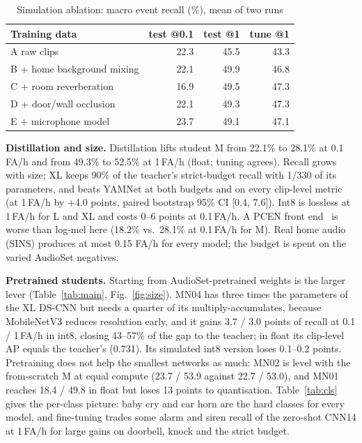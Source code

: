 \documentclass[conference]{IEEEtran}
\begin{document}
\begin{table}[t]\centering\caption{Simulation ablation: macro event recall (\%), mean of two runs}\label{tab:sim}
\begin{tabular}{lrrr}\toprule
Training data & test @0.1 & test @1 & tune @1 \\ \midrule
A raw clips & 22.3 & 45.5 & 43.3 \\
B + home background mixing & 22.1 & 49.9 & 46.8 \\
C + room reverberation & 16.9 & 49.5 & 47.3 \\
D + door/wall occlusion & 22.1 & 49.3 & 47.3 \\
E + microphone model & 23.7 & 49.1 & 47.1 \\ \bottomrule
\end{tabular}\end{table}

\textbf{Distillation and size.} Distillation lifts student M from 22.1\% to 28.1\% at 0.1\,FA/h
and from 49.3\% to 52.5\% at 1\,FA/h (float; tuning agrees). Recall grows with size; XL keeps 90\% of the teacher's strict-budget recall with 1/330 of its
parameters, and beats YAMNet at both budgets and on every clip-level metric (at 1\,FA/h by
+4.0 points, paired bootstrap 95\% CI [0.4, 7.6]). Int8 is lossless at
1\,FA/h for L and XL and costs 0--6 points at 0.1\,FA/h. A PCEN front end~\cite{pcen} is worse
than log-mel here (18.2\% vs.\ 28.1\% at 0.1\,FA/h for M). Real home audio (SINS) produces at
most 0.15 FA/h for every model; the budget is spent on the varied AudioSet negatives.

\textbf{Pretrained students.} Starting from AudioSet-pretrained weights is the larger lever
(Table~\ref{tab:main}, Fig.~\ref{fig:size}). MN04 has three times the parameters of the XL
DS-CNN but needs a quarter of its multiply-accumulates, because MobileNetV3 reduces resolution
early, and it gains 3.7 / 3.0 points of recall at 0.1 / 1\,FA/h in int8, closing 43--57\% of the
gap to the teacher; in float its clip-level AP equals the teacher's (0.731). Its simulated int8
version loses 0.1--0.2 points. Pretraining does not help the smallest networks as much: MN02 is
level with the from-scratch M at equal compute (23.7 / 53.9 against 22.7 / 53.0), and MN01
reaches 18.4 / 49.8 in float but loses 13 points to quantisation. Table~\ref{tab:cls} gives the
per-class picture: baby cry and car horn are the hard classes for every model, and fine-tuning
trades some alarm and siren recall of the zero-shot CNN14 at 1\,FA/h for large gains on doorbell,
knock and the strict budget.
\end{document}
